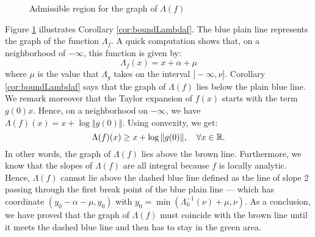 \documentclass{sig-alternate}
\begin{document}
\begin{figure}
\null \hfill
{}
\hfill \null

\caption{Admissible region for the graph of $\Lambda(f)$}
\label{fig:area}
\end{figure}

Figure \ref{fig:area} illustrates Corollary \ref{cor:boundLambdaf}. The 
blue plain line represents the graph of the function $\Lambda_f$. A 
quick computation shows that, on a neighborhood of ${-}\infty$, this 
function is given by:
$$\Lambda_f(x) = x + \alpha + \mu$$
where $\mu$ is the value that $\Lambda_g$ takes on the interval 
$]{-}\infty, \nu]$. Corollary \ref{cor:boundLambdaf} says that the
graph of $\Lambda(f)$ lies below the plain blue line. We remark
moreover that the Taylor expansion of $f(x)$ starts with the term
$g(0) x$. Hence, on a neighborhood on ${-}\infty$, we have 
$\Lambda(f)(x) = x + \log \Vert g(0) \Vert$. Using convexity, we 
get:
$$\Lambda(f)(x) \geq x + \log \Vert g(0) \Vert, 
  \quad \forall x \in \mathbb R.$$
In other words, the graph of $\Lambda(f)$ lies above the brown line.
Furthermore, we know that the slopes of $\Lambda(f)$ are all integral
because $f$ is locally analytic. Hence, $\Lambda(f)$ cannot lie above
the dashed blue line defined as the line of slope $2$ passing through
the first break point of the blue plain line --- which has coordinate 
$(y_0 - \alpha - \mu, y_0)$ with $y_0 = \min(\Lambda_h^{-1}(\nu) + \mu, 
\nu)$. As a conclusion, we have proved that the graph of $\Lambda(f)$ 
must coincide with the brown line until it meets the dashed blue line 
and then has to stay in the green area.
\end{document}
